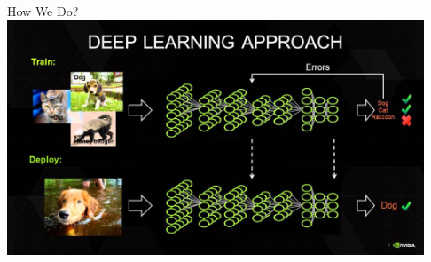 \documentclass{beamer}
\begin{document}
 \begin{frame}{How We Do?}
     \includegraphics[height=7cm,width=\textwidth]{deep.jpg}
\end{frame}
\end{document}
